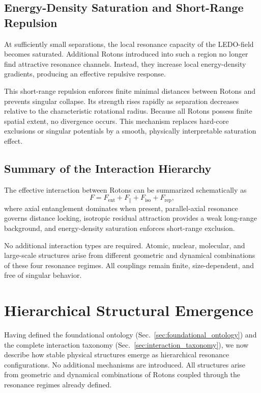 \documentclass[11pt,a4paper]{article}
\begin{document}
\subsection{Energy-Density Saturation and Short-Range Repulsion}

At sufficiently small separations, the local resonance capacity of the LEDO-field becomes saturated.
Additional Rotons introduced into such a region no longer find attractive resonance channels.
Instead, they increase local energy-density gradients, producing an effective repulsive response.

This short-range repulsion enforces finite minimal distances between Rotons and prevents singular
collapse.
Its strength rises rapidly as separation decreases relative to the characteristic rotational
radius.
Because all Rotons possess finite spatial extent, no divergence occurs.
This mechanism replaces hard-core exclusions or singular potentials by a smooth, physically
interpretable saturation effect.

\subsection{Summary of the Interaction Hierarchy}

The effective interaction between Rotons can be summarized schematically as
\[
F = F_{\mathrm{ent}} + F_{\parallel} + F_{\mathrm{iso}} + F_{\mathrm{rep}},
\]
where axial entanglement dominates when present, parallel-axial resonance governs distance locking,
isotropic residual attraction provides a weak long-range background, and energy-density saturation
enforces short-range exclusion.

No additional interaction types are required.
Atomic, nuclear, molecular, and large-scale structures arise from different geometric and dynamical
combinations of these four resonance regimes.
All couplings remain finite, size-dependent, and free of singular behavior.



\section{Hierarchical Structural Emergence}
\label{sec:structural_emergence}

Having defined the foundational ontology (Sec.~\ref{sec:foundational_ontology}) and the
complete interaction taxonomy (Sec.~\ref{sec:interaction_taxonomy}), we now describe how
stable physical structures emerge as hierarchical resonance configurations.
No additional mechanisms are introduced.
All structures arise from geometric and dynamical combinations of Rotons coupled through
the resonance regimes already defined.
\end{document}
